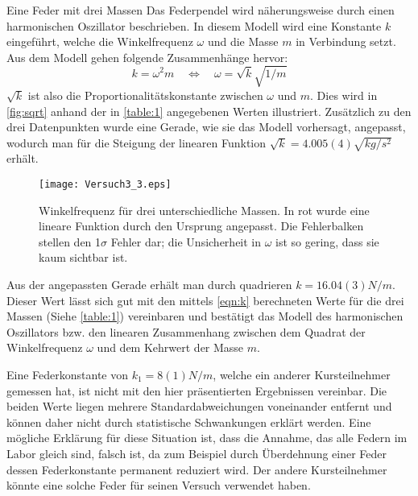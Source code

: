 \documentclass{alex_gp}
\begin{document}
\begin{mybox}{Eine Feder mit drei Massen}
	Das Federpendel wird näherungsweise durch einen harmonischen Oszillator beschrieben. In diesem Modell wird eine Konstante \( k \) eingeführt, welche die Winkelfrequenz \( \omega \) und die Masse \( m \) in Verbindung setzt. Aus dem Modell gehen folgende Zusammenhänge hervor:
	\begin{equation}\label{eqn:k}
		k = \omega^2 m \quad \Leftrightarrow\quad \omega = \sqrt{k}\sqrt{1/m}
	\end{equation}
	\( \sqrt{k} \) ist also die Proportionalitätskonstante zwischen \( \omega \) und \( m \). Dies wird in \autoref{fig:sqrt} anhand der in \autoref{table:1} angegebenen Werten illustriert. Zusätzlich zu den drei Datenpunkten wurde eine Gerade, wie sie das Modell vorhersagt, angepasst, wodurch man für die Steigung der linearen Funktion \( \sqrt{k} = 4.005(4) \unit{\sqrt{kg / s^2}} \) erhält.
	\begin{figure}[H]
		\centering
		\texttt{[image: Versuch3\_3.eps]}
		\caption{Winkelfrequenz für drei unterschiedliche Massen. In rot wurde eine lineare Funktion durch den Ursprung angepasst. Die Fehlerbalken stellen den 1$\sigma$ Fehler dar; die Unsicherheit in \( \omega \) ist so gering, dass sie kaum sichtbar ist.}
		\label{fig:sqrt}
	\end{figure}
	Aus der angepassten Gerade erhält man durch quadrieren \( k = 16.04(3) \unit{N/m} \). Dieser Wert lässt sich gut mit den mittels \autoref{eqn:k} berechneten Werte für die drei Massen (Siehe \autoref{table:1}) vereinbaren und bestätigt das Modell des harmonischen Oszillators bzw. den linearen Zusammenhang zwischen dem Quadrat der Winkelfrequenz $\omega$ und dem Kehrwert der Masse \( m \). 

	Eine Federkonstante von \( k_1 = 8(1) \unit{N/m} \), welche ein anderer Kursteilnehmer gemessen hat, ist nicht mit den hier präsentierten Ergebnissen vereinbar. Die beiden Werte liegen mehrere Standardabweichungen voneinander entfernt und können daher nicht durch statistische Schwankungen erklärt werden. Eine mögliche Erklärung für diese Situation ist, dass die Annahme, das alle Federn im Labor gleich sind, falsch ist, da zum Beispiel durch Überdehnung einer Feder dessen Federkonstante permanent reduziert wird. Der andere Kursteilnehmer könnte eine solche Feder für seinen Versuch verwendet haben.
\end{mybox}
\end{document}
